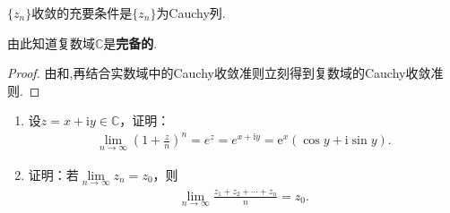 \documentclass[../../main.tex]{subfiles}%
\begin{document}
\begin{theorem}[复数域的Cauchy收敛准则]\label{theorem:复数域的Cauchy收敛准则}
\(\{ z_n \}\)收敛的充要条件是\(\{ z_n \}\)为Cauchy列.
\end{theorem}
\begin{note}
由此知道复数域\(\mathbb{C}\)是\textbf{完备的}.
\end{note}
\begin{proof}
由和,再结合实数域中的Cauchy收敛准则立刻得到复数域的Cauchy收敛准则.
\end{proof}

\begin{proposition}\label{proposition:复变版本的经典极限和Cacuhy命题}
\begin{enumerate}[(1)]
\item\label{proposition:复变版本的经典极限和Cacuhy命题-1} 设$z = x + \mathrm{i}y \in \mathbb{C}$，证明：
\begin{align*}
\lim\limits_{n \to \infty} \left(1 + \frac{z}{n}\right)^n = e^z = e^{x+\text{i}y} = \mathrm{e}^x (\cos y + \mathrm{i}\sin y).
\end{align*}

\item\label{proposition:复变版本的经典极限和Cacuhy命题-2} 证明：若$\lim\limits_{n \to \infty} z_n = z_0$，则
\begin{align*}
\lim\limits_{n \to \infty} \frac{z_1 + z_2 + \cdots + z_n}{n} = z_0.
\end{align*}
\end{enumerate}
\end{proposition}
\end{document}
